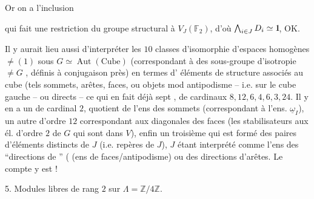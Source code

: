 Or on a  l'inclusion



qui fait une restriction du groupe structural à $V_J(\mathbb F_2)$, d'où $\bigwedge_{i\in J}D_i\simeq\mathord{1\mkern-4mu\rule{.055em}{.66em}}$, OK.

Il y aurait lieu aussi d'interpréter les $10$ classes d'isomorphie d'espaces homogènes $\ne(1)$ sous $G\simeq\operatorname{Aut}(\text{Cube})$ (correspondant à des  sous-groupe d'isotropie $\ne G$ \unsure{\}|)}, définis à conjugaison près) en termes d' éléments de structure associés au cube (tels sommets, arêtes, faces, ou  objets mod antipodisme -- i.e. sur le cube gauche -- ou   directs -- ce qui en fait déjà sept , de cardinaux $8,12,6,4,6,3,24$. Il y en a un de cardinal $2$, quotient de l'ens des sommets (correspondant à l'ens. $\underline\omega_I$), un autre d'ordre $12$ correspondant aux  diagonales des faces  (les stabilisateurs   aux él. d'ordre $2$ de $G$ qui  sont  dans $V$), enfin un troisième qui est formé des paires d'éléments distincts de $J$ (i.e. repères de $J$), $J$ étant interprété comme l'ens des ``directions de  '' ( (ens de faces/antipodisme) ou des directions d'arêtes. Le compte y est !





5. Modules libres de rang $2$ sur $\Lambda=\mathbb Z/4\mathbb Z$.

